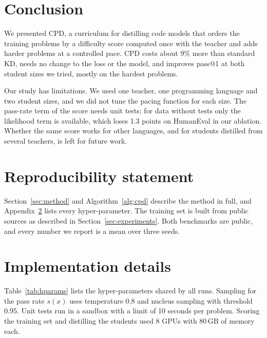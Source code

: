\documentclass{article} %
\begin{document}
\section{Conclusion}
\label{sec:conclusion}

We presented CPD, a curriculum for distilling code models that orders the training problems by a difficulty score computed once with the teacher and adds harder problems at a controlled pace.
CPD costs about 9\% more than standard KD, needs no change to the loss or the model, and improves pass@1 at both student sizes we tried, mostly on the hardest problems.

Our study has limitations.
We used one teacher, one programming language and two student sizes, and we did not tune the pacing function for each size.
The pass-rate term of the score needs unit tests; for data without tests only the likelihood term is available, which loses 1.3 points on HumanEval in our ablation.
Whether the same score works for other languages, and for students distilled from several teachers, is left for future work.

\section*{Reproducibility statement}

Section~\ref{sec:method} and Algorithm~\ref{alg:cpd} describe the method in full, and Appendix~\ref{app:impl} lists every hyper-parameter.
The training set is built from public sources as described in Section~\ref{sec:experiments}.
Both benchmarks are public, and every number we report is a mean over three seeds.




\appendix

\section{Implementation details}
\label{app:impl}

Table~\ref{tab:hparams} lists the hyper-parameters shared by all runs.
Sampling for the pass rate $s(x)$ uses temperature 0.8 and nucleus sampling with threshold 0.95.
Unit tests run in a sandbox with a limit of 10 seconds per problem.
Scoring the training set and distilling the students used 8 GPUs with 80\,GB of memory each.
\end{document}
